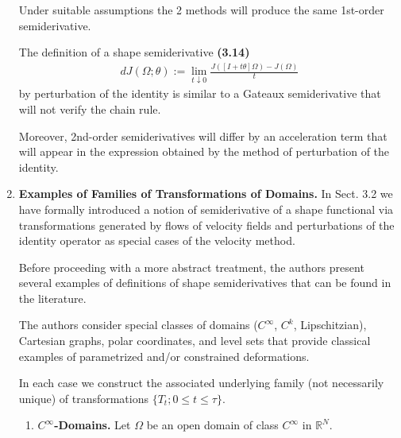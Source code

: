 \documentclass{book}
\numberwithin{equation}{section}
\begin{document}
\begin{enumerate}
    Under suitable assumptions the 2 methods will produce the same 1st-order semiderivative.
    
    The definition of a shape semiderivative \textbf{(3.14)}
    \begin{align*}
        dJ(\Omega;\theta) := \lim_{t\downarrow 0} \frac{J\left([I + t\theta]\Omega\right) - J(\Omega)}{t}
    \end{align*}
    by perturbation of the identity is similar to a Gateaux semiderivative that will not verify the chain rule.
    
    Moreover, 2nd-order semiderivatives will differ by an acceleration term that will appear in the expression obtained by the method of perturbation of the identity.
    \item \textbf{Examples of Families of Transformations of Domains.} In Sect. 3.2 we have formally introduced a notion of semiderivative of a shape functional via transformations generated by flows of velocity fields and perturbations of the identity operator as special cases of the velocity method.
    
    Before proceeding with a more abstract treatment, the authors present several examples of definitions of shape semiderivatives that can be found in the literature.
    
    The authors consider special classes of domains ($C^\infty$, $C^k$, Lipschitzian), Cartesian graphs, polar coordinates, and level sets that provide classical examples of parametrized and/or constrained deformations.
    
    In each case we construct the associated underlying family (not necessarily unique) of transformations $\{T_t;0\le t\le\tau\}$.
    \begin{enumerate}
        \item \textbf{$C^\infty$-Domains.} Let $\Omega$ be an open domain of class $C^\infty$ in $\mathbb{R}^N$.
        

\end{enumerate}
\end{enumerate}
\end{document}
